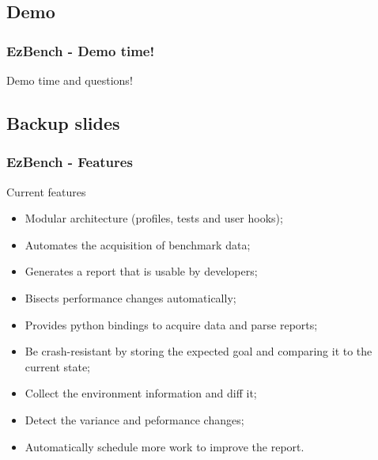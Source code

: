 \documentclass[11pt,english,compress]{beamer}
\begin{document}
\subsection{Demo}
\begin{frame}
	\frametitle{EzBench - Demo time!}

	\begin{block}{}
		Demo time and questions!
	\end{block}
\end{frame}

\subsection{Backup slides}
\begin{frame}
	\frametitle{EzBench - Features}

	\begin{block}{Current features}
		\begin{itemize}
			\item Modular architecture (profiles, tests and user hooks);\pause
			\item Automates the acquisition of benchmark data;\pause
			\item Generates a report that is usable by developers;\pause
			\item Bisects performance changes automatically;\pause
			\item Provides python bindings to acquire data and parse reports;\pause
			\item Be crash-resistant by storing the expected goal and comparing it to the current state;\pause
			\item Collect the environment information and diff it;\pause
			\item Detect the variance and peformance changes;\pause
			\item Automatically schedule more work to improve the report.
		\end{itemize}
	\end{block}
\end{frame}
\end{document}
